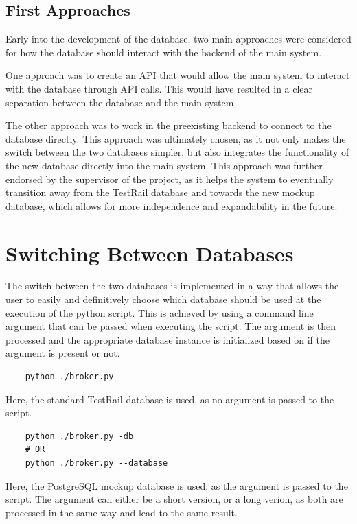 \subsection{First Approaches}

Early into the development of the database, two main approaches were considered for how the database should interact with the backend of the main system. 

One approach was to create an API that would allow the main system to interact with the database through API calls. This would have resulted in a clear separation between the database and the main system.

The other approach was to work in the preexisting backend to connect to the database directly. This approach was ultimately chosen, as it not only makes the switch between the two databases simpler, but also integrates the functionality of the new database directly into the main system. This approach was further endorsed by the supervisor of the project, as it helps the system to eventually transition away from the TestRail database and towards the new mockup database, which allows for more independence and expandability in the future.

\section{Switching Between Databases}

The switch between the two databases is implemented in a way that allows the user to easily and definitively choose which database should be used at the execution of the python script. This is achieved by using a command line argument that can be passed when executing the script. The argument is then processed and the appropriate database instance is initialized based on if the argument is present or not. 

\begin{verbatim}
    python ./broker.py
\end{verbatim}

Here, the standard TestRail database is used, as no argument is passed to the script.

\begin{verbatim}
    python ./broker.py -db
    # OR
    python ./broker.py --database
\end{verbatim}

Here, the PostgreSQL mockup database is used, as the argument is passed to the script. The argument can either be a short version, or a long verion, as both are processed in the same way and lead to the same result.
